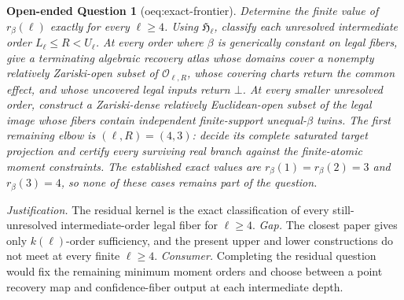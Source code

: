 \documentclass{article}
\newtheorem{openendedquestion}{Open-ended Question}
\begin{document}
\begin{openendedquestion}[oeq:exact-frontier]\label{oeq:exact-frontier}
Determine the finite value of \(r_\beta(\ell)\) exactly for every \(\ell\ge4\).  Using \(\mathfrak H_{\ell}\), classify each unresolved intermediate order \(L_\ell\le R<U_\ell\).  At every order where \(\beta\) is generically constant on legal fibers, give a terminating algebraic recovery atlas whose domains cover a nonempty relatively Zariski-open subset of \(\mathcal O_{\ell,R}\), whose covering charts return the common effect, and whose uncovered legal inputs return \(\bot\).  At every smaller unresolved order, construct a Zariski-dense relatively Euclidean-open subset of the legal image whose fibers contain independent finite-support unequal-\(\beta\) twins.  The first remaining elbow is \((\ell,R)=(4,3)\): decide its complete saturated target projection and certify every surviving real branch against the finite-atomic moment constraints.  The established exact values are \(r_\beta(1)=r_\beta(2)=3\) and \(r_\beta(3)=4\), so none of these cases remains part of the question.
\end{openendedquestion}
\par\smallskip\noindent \textit{Justification.} The residual kernel is the exact classification of every still-unresolved intermediate-order legal fiber for \(\ell\ge4\). \textit{Gap.} The closest paper gives only \(k(\ell)\)-order sufficiency, and the present upper and lower constructions do not meet at every finite \(\ell\ge4\). \textit{Consumer.} Completing the residual question would fix the remaining minimum moment orders and choose between a point recovery map and confidence-fiber output at each intermediate depth.
\end{document}
